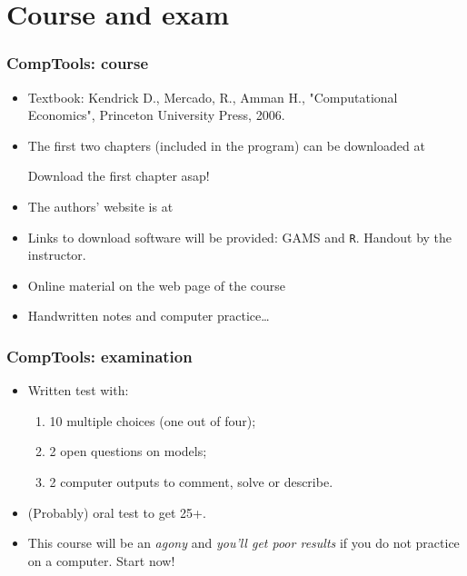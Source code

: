 \documentclass[handout,a4paper]{beamer} 			%
\begin{document}
\section{Course and exam}
\begin{frame}
    \frametitle{CompTools: course}
    \begin{itemize}
	\item Textbook: Kendrick D., Mercado, R., Amman H.,
	"Computational Economics", Princeton University Press, 2006.
	
	\item The first two chapters (included in the program) can be 
	downloaded at 
	
	\alert{Download the first chapter asap!}
	
	\item The authors' website is at

	
	\item Links to download software will be provided: GAMS and 
	\texttt{R}. Handout by the instructor.
	
	\item Online material on the web page of the course\\


	\item Handwritten notes and computer practice\ldots
     \end{itemize}
\end{frame}

\begin{frame}
    \frametitle{CompTools: examination}
    \begin{itemize}
    \item Written test with:
    \begin{enumerate}
        \item 10 multiple choices (one out of four);
    
        \item 2 open questions on models;
    
        \item 2 computer outputs to comment, solve or describe.
    \end{enumerate}
    
    \item (Probably) oral test to get 25+.
    
    \item This course will be an \emph{agony} and \emph{you'll get
    poor results} if you do not practice on a computer. Start now!

\end{itemize}
\end{frame}
\end{document}
